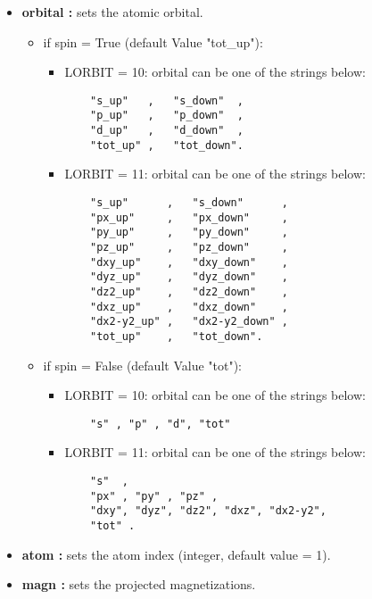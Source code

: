 \documentclass[11pt]{article}
\providecommand{\tightlist}{%
      \setlength{\itemsep}{0pt}\setlength{\parskip}{0pt}}
\begin{document}
\begin{itemize}
\item
  \textbf{orbital :} sets the atomic orbital.

  \begin{itemize}
  \tightlist
  \item
    if spin = True (default Value "tot\_up"):

    \begin{itemize}
    \item
      LORBIT = 10: orbital can be one of the strings below:

\begin{verbatim}
    "s_up"   ,   "s_down"  ,
    "p_up"   ,   "p_down"  ,
    "d_up"   ,   "d_down"  ,
    "tot_up" ,   "tot_down".
\end{verbatim}
    \item
      LORBIT = 11: orbital can be one of the strings below:

\begin{verbatim}
    "s_up"      ,   "s_down"      ,     
    "px_up"     ,   "px_down"     ,     
    "py_up"     ,   "py_down"     ,     
    "pz_up"     ,   "pz_down"     ,    
    "dxy_up"    ,   "dxy_down"    ,    
    "dyz_up"    ,   "dyz_down"    ,    
    "dz2_up"    ,   "dz2_down"    ,    
    "dxz_up"    ,   "dxz_down"    ,    
    "dx2-y2_up" ,   "dx2-y2_down" ,
    "tot_up"    ,   "tot_down".
\end{verbatim}
    \end{itemize}
  \item
    if spin = False (default Value "tot"):

    \begin{itemize}
    \item
      LORBIT = 10: orbital can be one of the strings below:

\begin{verbatim}
    "s" , "p" , "d", "tot"
\end{verbatim}
    \item
      LORBIT = 11: orbital can be one of the strings below:

\begin{verbatim}
    "s"  ,
    "px" , "py" , "pz" ,
    "dxy", "dyz", "dz2", "dxz", "dx2-y2",
    "tot" .
\end{verbatim}
    \end{itemize}
  \end{itemize}
\item
  \textbf{atom :} sets the atom index (integer, default value = 1).
\item
  \textbf{magn :} sets the projected magnetizations.


\end{itemize}
\end{document}
